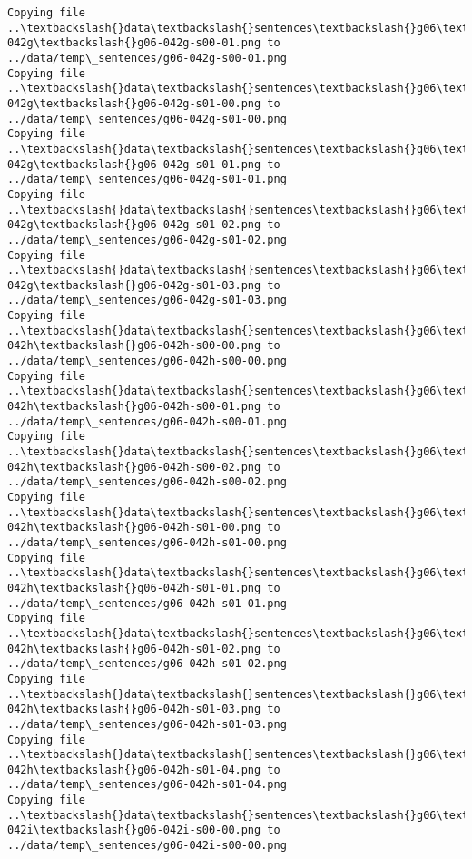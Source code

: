 \documentclass[11pt]{article}
\begin{document}
\begin{Verbatim}[commandchars=\\\{\}]
Copying file ..\textbackslash{}data\textbackslash{}sentences\textbackslash{}g06\textbackslash{}g06-042g\textbackslash{}g06-042g-s00-01.png to
../data/temp\_sentences/g06-042g-s00-01.png
Copying file ..\textbackslash{}data\textbackslash{}sentences\textbackslash{}g06\textbackslash{}g06-042g\textbackslash{}g06-042g-s01-00.png to
../data/temp\_sentences/g06-042g-s01-00.png
Copying file ..\textbackslash{}data\textbackslash{}sentences\textbackslash{}g06\textbackslash{}g06-042g\textbackslash{}g06-042g-s01-01.png to
../data/temp\_sentences/g06-042g-s01-01.png
Copying file ..\textbackslash{}data\textbackslash{}sentences\textbackslash{}g06\textbackslash{}g06-042g\textbackslash{}g06-042g-s01-02.png to
../data/temp\_sentences/g06-042g-s01-02.png
Copying file ..\textbackslash{}data\textbackslash{}sentences\textbackslash{}g06\textbackslash{}g06-042g\textbackslash{}g06-042g-s01-03.png to
../data/temp\_sentences/g06-042g-s01-03.png
Copying file ..\textbackslash{}data\textbackslash{}sentences\textbackslash{}g06\textbackslash{}g06-042h\textbackslash{}g06-042h-s00-00.png to
../data/temp\_sentences/g06-042h-s00-00.png
Copying file ..\textbackslash{}data\textbackslash{}sentences\textbackslash{}g06\textbackslash{}g06-042h\textbackslash{}g06-042h-s00-01.png to
../data/temp\_sentences/g06-042h-s00-01.png
Copying file ..\textbackslash{}data\textbackslash{}sentences\textbackslash{}g06\textbackslash{}g06-042h\textbackslash{}g06-042h-s00-02.png to
../data/temp\_sentences/g06-042h-s00-02.png
Copying file ..\textbackslash{}data\textbackslash{}sentences\textbackslash{}g06\textbackslash{}g06-042h\textbackslash{}g06-042h-s01-00.png to
../data/temp\_sentences/g06-042h-s01-00.png
Copying file ..\textbackslash{}data\textbackslash{}sentences\textbackslash{}g06\textbackslash{}g06-042h\textbackslash{}g06-042h-s01-01.png to
../data/temp\_sentences/g06-042h-s01-01.png
Copying file ..\textbackslash{}data\textbackslash{}sentences\textbackslash{}g06\textbackslash{}g06-042h\textbackslash{}g06-042h-s01-02.png to
../data/temp\_sentences/g06-042h-s01-02.png
Copying file ..\textbackslash{}data\textbackslash{}sentences\textbackslash{}g06\textbackslash{}g06-042h\textbackslash{}g06-042h-s01-03.png to
../data/temp\_sentences/g06-042h-s01-03.png
Copying file ..\textbackslash{}data\textbackslash{}sentences\textbackslash{}g06\textbackslash{}g06-042h\textbackslash{}g06-042h-s01-04.png to
../data/temp\_sentences/g06-042h-s01-04.png
Copying file ..\textbackslash{}data\textbackslash{}sentences\textbackslash{}g06\textbackslash{}g06-042i\textbackslash{}g06-042i-s00-00.png to
../data/temp\_sentences/g06-042i-s00-00.png

\end{Verbatim}
\end{document}

